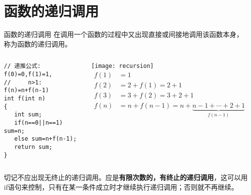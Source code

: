 \section{函数的递归调用}

\begin{frame}{函数的递归调用}
\vspace{-0.2cm}
在调用一个函数的过程中又出现直接或间接地调用该函数本身，称为函数的递归调用。
\vspace{-0.4cm}
\begin{columns}[T]
\begin{lstlisting}
// 递推公式: f(0)=0,f(1)=1, 
//     n>1: f(n)=n+f(n-1)
int f(int n) 
{
   int sum;
   if(n==0||n==1) sum=n;
   else sum=n+f(n-1); 
   return sum; 
}
\end{lstlisting}
\texttt{[image: recursion]}
\vspace{-0.5cm}
\begin{align*}
f(1)&=1\\
f(2)&=2+f(1)=2+1\\
f(3)&=3+f(2)=3+2+1\\
f(n)&=n+f(n-1)=n+\underbrace{n-1+\cdots+2+1}_{f(n-1)}
\end{align*}
\end{columns}
切记不应出现无终止的递归调用。应是\textbf{有限次数的，有终止的递归调用}，这可以用if语句来控制，只有在某一条件成立时才继续执行递归调用；否则就不再继续。
\end{frame}

